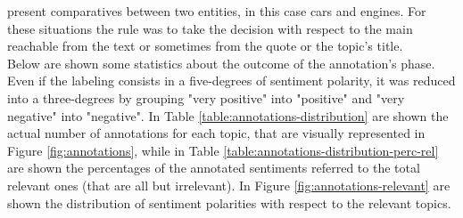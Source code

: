 present comparatives between two entities, in this case cars and engines. For these situations the rule was to take the decision with respect to the main reachable from the text or sometimes from the quote or the topic's title.\\

Below are shown some statistics about the outcome of the annotation's phase. Even if the labeling consists in a five-degrees of sentiment polarity, it was reduced into a three-degrees by grouping "very positive" into "positive" and "very negative" into "negative".
In Table \ref{table:annotations-distribution} are shown the actual number of annotations for each topic, that are visually represented in Figure \ref{fig:annotations}, while in Table \ref{table:annotations-distribution-perc-rel} are shown the percentages of the annotated sentiments referred to the total relevant ones (that are all but irrelevant). In Figure \ref{fig:annotations-relevant} are shown the distribution of sentiment polarities with respect to the relevant topics.


